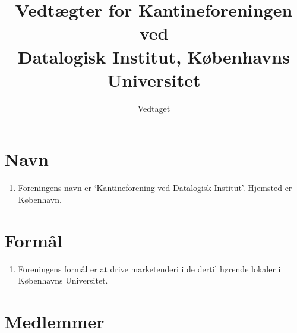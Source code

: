 \documentclass[a4paper, 10pt]{article}
\title{Vedtægter for Kantineforeningen ved \\ Datalogisk Institut,
Københavns Universitet}
\author{}
\date{Vedtaget \vedtagsdato{}}
\newenvironment{stykenum}{
  \begin{enumerate}[%
    label=Stk.~\arabic*., ref=\textsection~\theenumi~Stk.~\arabic*, start=1]
}{\end{enumerate}}
\begin{document}
\maketitle
\thispagestyle{first}

\section{Navn}

\begin{stykenum}
\item
\label{navn} Foreningens navn er `Kantineforening ved Datalogisk Institut'.
Hjemsted er København.
\end{stykenum}

\section{Formål}

\begin{stykenum}
    \item
    \label{formaal} Foreningens formål er at drive marketenderi i de
    dertil hørende lokaler i Kø\-benhavns Universitet.
\end{stykenum}

\section{Medlemmer}
\end{document}
